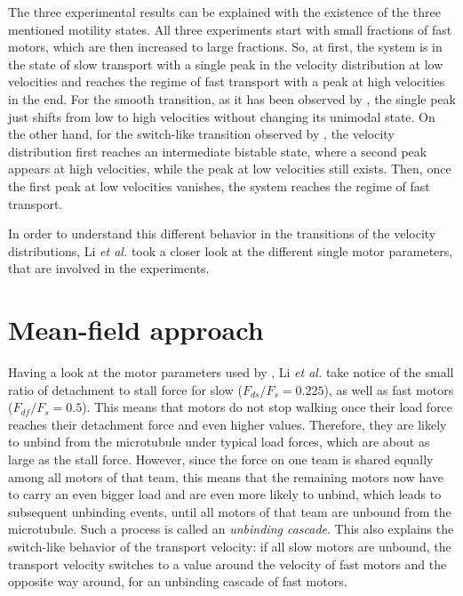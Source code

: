 The three experimental results \cite{larson, bieling, jcb174} can be explained with the existence of the three mentioned motility states. All three experiments start with small fractions of fast
motors, which are then increased to large fractions. So, at first, the system is in the state of slow transport with a single peak in the velocity distribution at low velocities and reaches the
regime of fast transport with a peak at high velocities in the end. For the smooth transition, as it has been observed by \cite{bieling, jcb174}, the single peak just shifts from low to high
velocities without changing its unimodal state. On the other hand, for the switch-like transition observed by \cite{larson}, the velocity distribution first reaches an intermediate bistable state,
where a second peak appears at high velocities, while the peak at low velocities still exists. Then, once the first peak at low velocities vanishes, the system reaches the regime of fast transport.

In order to understand this different behavior in the transitions of the velocity distributions, Li \textit{et al.} \cite{li} took a closer look at the different single motor parameters, that are 
involved in the experiments.


\section{Mean-field approach}\label{s.mean-field-approach}
Having a look at the motor parameters used by \cite{larson}, Li \textit{et al.} \cite{li} take notice of the small ratio of detachment to stall force for slow (\mbox{$F_{ds}/F_s = 0.225$}), as
well as fast motors (\mbox{$F_{df}/F_s = 0.5$}). This means that motors do not stop walking once their load force reaches their detachment force and even higher values. Therefore, they are
likely to unbind from the microtubule under typical load forces, which are about as large as the stall force. However, since the force on one team is shared equally among all motors of that team,
this means that the remaining motors now have to carry an even bigger load and are even more likely to unbind, which leads to subsequent unbinding events, until all motors of that team are unbound
from the microtubule. Such a process is called an \textit{unbinding cascade}. This also explains the switch-like behavior of the transport velocity: if all slow motors are unbound, the transport
velocity switches to a value around the velocity of fast motors and the opposite way around, for an unbinding cascade of fast motors.

